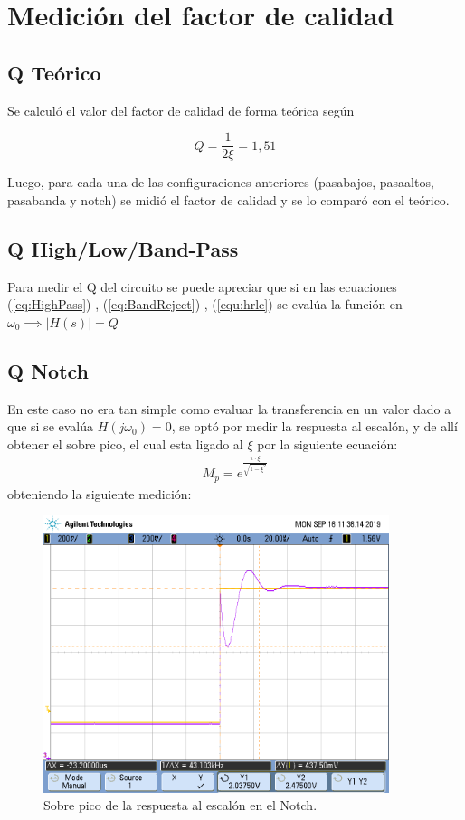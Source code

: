 \section{Medición del factor de calidad}
\subsection{Q Teórico}
Se calculó el valor del factor de calidad de forma teórica según 

\begin{equation}
    Q=\frac{1}{2\xi}=1,51
\end{equation}

Luego, para cada una de las configuraciones anteriores (pasabajos, pasaaltos, pasabanda y notch) se midió el factor de calidad y se lo comparó con el teórico.
\subsection{Q High/Low/Band-Pass}
Para medir el Q del circuito se puede apreciar que si en las ecuaciones (\ref{eq:HighPass}) , (\ref{eq:BandReject}) , (\ref{equ:hrlc}) se evalúa la función en $\omega_0 \implies |H(s)|=Q$

\subsection{Q Notch}
En este caso no era tan simple como evaluar la transferencia en un valor dado a que si se evalúa $H(j\omega_0)=0$, se optó por medir la respuesta al escalón, y de allí obtener el sobre pico, el cual esta ligado al $\xi$ por la siguiente ecuación:
\begin{align}M_p = e^{\frac{\pi \cdot \xi}{\sqrt{1-\xi^2}}} \end{align}
obteniendo la siguiente medición:
\begin{figure}[H]
	\centering
	\includegraphics[width=0.9\textwidth]{Mediciones_pendrive_alan/ej4sobrepiconotch.png}
\caption{Sobre pico de la respuesta al escalón en el Notch.}
	\label{fig:Overshoot5}
\end{figure}


